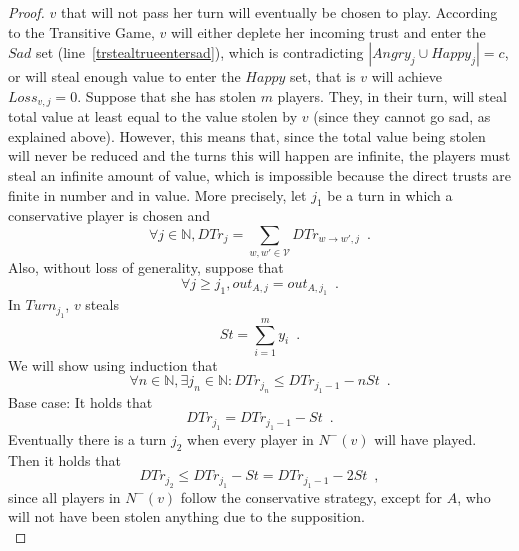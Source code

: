 \documentclass[11pt]{llncs}
\begin{document}
\begin{proof}
       $v$ that will not pass her turn will eventually be chosen to play. According to the Transitive Game, $v$ will either
       deplete her incoming trust and enter the $Sad$ set (line~\ref{trstealtrueentersad}), which is contradicting $|Angry_j
       \cup Happy_j| = c$, or will steal enough value to enter the $Happy$ set, that is $v$ will achieve $Loss_{v, j} = 0$.
       Suppose that she has stolen $m$ players. They, in their turn, will steal total value at least equal to the value
       stolen by $v$ (since they cannot go sad, as explained above). However, this means that, since the total value being
       stolen will never be reduced and the turns this will happen are infinite, the players must steal an infinite amount of
       value, which is impossible because the direct trusts are finite in number and in value. More precisely, let $j_1$ be
       a turn in which a conservative player is chosen and
       \begin{equation}
          \forall j \in \mathbb{N}, DTr_j = \sum\limits_{w,w' \in \mathcal{V}}DTr_{w \rightarrow w', j} \enspace.
       \end{equation}
       Also, without loss of generality, suppose that
       \begin{equation}
          \forall j \geq j_1, out_{A, j} = out_{A, j_1} \enspace.
       \end{equation}
       In $Turn_{j_1}$, $v$ steals
       \begin{equation}
          St = \sum\limits_{i=1}^{m}y_i \enspace.
       \end{equation}
       We will show using induction that
       \begin{equation}
          \forall n \in \mathbb{N}, \exists j_n \in \mathbb{N} : DTr_{j_n} \leq DTr_{j_1-1} - nSt \enspace.
       \end{equation}
       Base case: It holds that
       \begin{equation}
          DTr_{j_1} = DTr_{j_1-1} - St \enspace.
       \end{equation}
       Eventually there is a turn $j_2$ when every player in $N^{-}(v)$ will have played. Then it holds that
       \begin{equation}
          DTr_{j_2} \leq DTr_{j_1} - St = DTr_{j_1-1} - 2St \enspace,
       \end{equation}
       since all players in $N^{-}(v)$ follow the conservative strategy, except for $A$, who will not have been stolen
       anything due to the supposition. \\

\end{proof}
\end{document}
